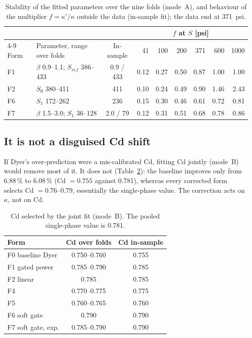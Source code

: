 \documentclass[11pt,a4paper]{article}
\begin{document}
\begin{table}[!htbp]
\centering\small
\caption{Stability of the fitted parameters over the nine folds (mode~A), and behaviour of the multiplier $f=\kappa'/\kappa$ outside the data (in-sample fit); the data end at 371~psi.}
\label{tab:stab}
\begin{tabular}{llcrrrrrr}\toprule
 & & & \multicolumn{6}{c}{$f$ at $S$ [psi]}\\\cmidrule(l){4-9}
Form & Parameter, range over folds & In-sample & 41 & 100 & 200 & 371 & 600 & 1000\\\midrule
F1 & $\beta$ 0.9--1.1; $S_{ref}$ 386--433 & 0.9 / 433 & 0.12 & 0.27 & 0.50 & 0.87 & 1.00 & 1.00\\
F2 & $S_0$ 380--411 & 411 & 0.10 & 0.24 & 0.49 & 0.90 & 1.46 & 2.43\\
F6 & $S_1$ 172--262 & 236 & 0.15 & 0.30 & 0.46 & 0.61 & 0.72 & 0.81\\
F7 & $\beta$ 1.5--3.0; $S_1$ 36--128 & 2.0 / 79 & 0.12 & 0.31 & 0.51 & 0.68 & 0.78 & 0.86\\\bottomrule
\end{tabular}
\end{table}

\subsection{It is not a disguised Cd shift}
If Dyer's over-prediction were a mis-calibrated Cd, fitting Cd jointly (mode~B) would remove most of it. It does not (Table~\ref{tab:cdb}): the baseline improves only from 6.88\,\% to 6.08\,\% (Cd $=0.755$ against 0.781), whereas every corrected form selects Cd $=0.76$--0.79, essentially the single-phase value. The correction acts on $\kappa$, not on Cd.

\begin{table}[!htbp]
\centering\small
\caption{Cd selected by the joint fit (mode~B). The pooled single-phase value is 0.781.}
\label{tab:cdb}
\begin{tabular}{lcc}\toprule
Form & Cd over folds & Cd in-sample\\\midrule
F0 baseline Dyer & 0.750--0.760 & 0.755\\
F1 gated power & 0.785--0.790 & 0.785\\
F2 linear & 0.785 & 0.785\\
F4 & 0.770--0.775 & 0.775\\
F5 & 0.760--0.765 & 0.760\\
F6 soft gate & 0.790 & 0.790\\
F7 soft gate, exp. & 0.785--0.790 & 0.790\\\bottomrule
\end{tabular}
\end{table}
\end{document}
